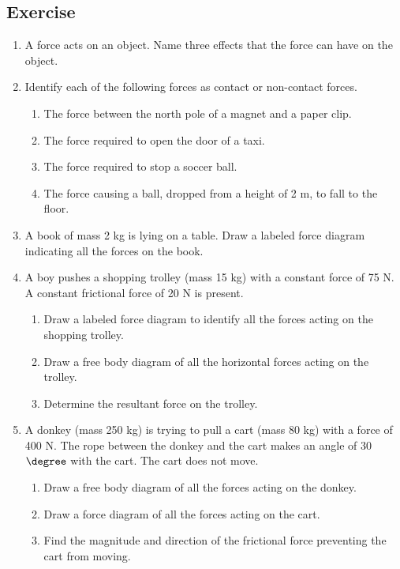 \subsection{Exercise}
\begin{enumerate}
\item{A force acts on an object. Name three effects that the force can have on the object.}
\item{Identify each of the following forces as contact or non-contact forces.
\begin{enumerate}
\item The force between the north pole of a magnet and a paper clip.
\item The force required to open the door of a taxi.
\item The force required to stop a soccer ball.
\item The force causing a ball, dropped from a height of 2 m, to fall to the floor.
\end{enumerate}
}
\item{A book of mass 2 kg is lying on a table. Draw a labeled force diagram indicating all the forces on the book.}
\item{A boy pushes a shopping trolley (mass 15 kg) with a constant force of 75 N. A constant frictional force of 20 N is present.
\begin{enumerate}
\item Draw a labeled force diagram to identify all the forces acting on the shopping trolley. 
\item Draw a free body diagram of all the horizontal forces acting on the trolley.
\item Determine the resultant force on the trolley.
\end{enumerate}
}
\item {A donkey (mass 250 kg) is trying to pull a cart (mass 80 kg) with a force of 400 N. The rope between the donkey and the cart makes an angle of 30$\degree$ with the cart. The cart does not move.
\begin{enumerate}
\item Draw a free body diagram of all the forces acting on the donkey.
\item Draw a force diagram of all the forces acting on the cart.
\item Find the magnitude and direction of the frictional force preventing the cart from moving.
\end{enumerate}
}
\end{enumerate}

